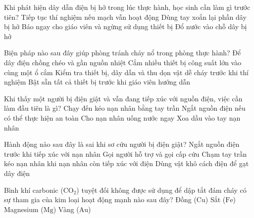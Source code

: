 \begin{ex}
Khi phát hiện dây dẫn điện bị hở trong lúc thực hành, học sinh cần làm gì trước tiên?
\choice
{Tiếp tục thí nghiệm nếu mạch vẫn hoạt động}
{Dùng tay xoắn lại phần dây bị hở}
{\True Báo ngay cho giáo viên và ngừng sử dụng thiết bị}
{Đổ nước vào chỗ dây bị hở}
\end{ex}

\begin{ex}
Biện pháp nào sau đây giúp phòng tránh cháy nổ trong phòng thực hành?
\choice
{Để dây điện chồng chéo và gần nguồn nhiệt}
{Cắm nhiều thiết bị công suất lớn vào cùng một ổ cắm}
{\True Kiểm tra thiết bị, dây dẫn và thu dọn vật dễ cháy trước khi thí nghiệm}
{Bật sẵn tất cả thiết bị trước khi giáo viên hướng dẫn}
\end{ex}

\begin{ex}
Khi thấy một người bị điện giật và vẫn đang tiếp xúc với nguồn điện, việc cần làm đầu tiên là gì?
\choice
{Chạy đến kéo nạn nhân bằng tay trần}
{\True Ngắt nguồn điện nếu có thể thực hiện an toàn}
{Cho nạn nhân uống nước ngay}
{Xoa dầu vào tay nạn nhân}
\end{ex}

\begin{ex}
Hành động nào sau đây là sai khi sơ cứu người bị điện giật?
\choice
{Ngắt nguồn điện trước khi tiếp xúc với nạn nhân}
{Gọi người hỗ trợ và gọi cấp cứu}
{\True Chạm tay trần kéo nạn nhân khi nạn nhân còn tiếp xúc với điện}
{Dùng vật khô cách điện để gạt dây điện}
\end{ex}

\begin{ex}
Bình khí carbonic ($\mathrm{CO}_2$) tuyệt đối không được sử dụng để dập tắt đám cháy có sự tham gia của kim loại hoạt động mạnh nào sau đây?
\choice
{Đồng ($\mathrm{Cu}$)}
{Sắt ($\mathrm{Fe}$)}
{\True Magnesium ($\mathrm{Mg}$)}
{Vàng ($\mathrm{Au}$)}
\end{ex}

